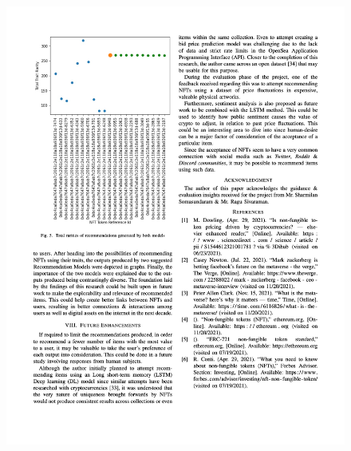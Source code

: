 \begin{figure}[h!]
\centering
\includegraphics[width=\textwidth]{images/appendix/papers/analysis/An Analysis of the Features Considerable for NFT Recommendations 5.jpeg}
\end{figure}

